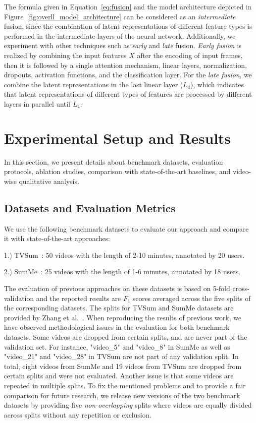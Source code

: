 \documentclass{article}
\begin{document}
The formula given in Equation~\ref{eq:fusion} and the model architecture depicted in Figure~\ref{fig:overll_model_architecture} can be considered as an \textit{intermediate} fusion, since the combination of latent representations of different feature types is performed in the intermediate layers of the neural network. Additionally, we experiment with other techniques such as \textit{early} and \textit{late} fusion. \textit{Early fusion} is realized by combining the input features $X$ after the encoding of input frames, then it is followed by a single attention mechanism, linear layers, normalization, dropouts, activation functions, and the classification layer. For the \textit{late fusion}, we combine the latent representations in the last linear layer ($L_4$), which indicates that latent representations of different types of features are processed by different layers in parallel until $L_4$.


\section{Experimental Setup and Results}\label{sec:experiments}

In this section, we present details about benchmark datasets, evaluation protocols, ablation studies, comparison with state-of-the-art baselines, and video-wise qualitative analysis.

\subsection{Datasets and Evaluation Metrics}
We use the following benchmark datasets to evaluate our approach and compare it with state-of-the-art approaches:

1.) TVSum~\cite{DBLP:conf/cvpr/SongVSJ15}: 50 videos with the length of 2-10 minutes, annotated by 20 users.
  
    
2.) SumMe~\cite{DBLP:conf/eccv/ZhangCSG16}: \num{25} videos with the length of 1-6 minutes, annotated by 18 users.

The evaluation of previous approaches on these datasets is based on 5-fold cross-validation and the reported results are $F_1$ scores averaged across the five splits of the corresponding datasets. The splits for TVSum and SumMe datasets are provided by Zhang et al.~\cite{DBLP:conf/eccv/ZhangCSG16}. When reproducing the results of previous work, we have observed methodological issues in the evaluation for both benchmark datasets. Some videos are dropped from certain splits, and are never part of the validation set. For instance, "video\_5" and "video\_8" in SumMe as well as "video\_21" and "video\_28" in TVSum are not part of any validation split. In total, eight videos from SumMe and \num{19} videos from TVSum are dropped from certain splits and were not evaluated. Another issue is that some videos are repeated in multiple splits. To fix the mentioned problems and to provide a fair comparison for future research, we release new versions of the two benchmark datasets by providing five \textit{non-overlapping} splits where videos are equally divided across splits without any repetition or exclusion.
\end{document}
